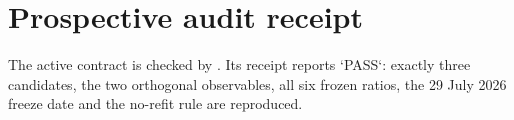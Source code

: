 \section{Prospective audit receipt}

The active contract is checked by
.
Its receipt
reports `PASS`: exactly three candidates, the two orthogonal observables, all six frozen ratios, the 29 July 2026 freeze date and the no-refit rule are reproduced.
